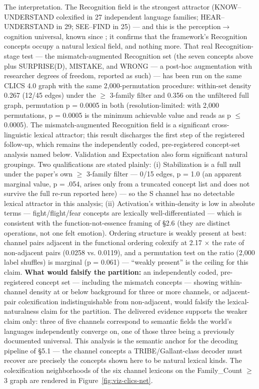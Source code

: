 \documentclass[11pt,twocolumn]{article}
\theoremstyle{plain}
\begin{document}
The interpretation. The Recognition field is the strongest attractor (KNOW–UNDERSTAND colexified in 27 independent language families; HEAR–UNDERSTAND in 29; SEE–FIND in 25) — and this is the perception$\to$cognition universal, known since \citet{viberg1984}; it confirms that the framework's Recognition concepts occupy a natural lexical field, and nothing more. That real Recognition-stage test — the mismatch-augmented Recognition set (the seven concepts above plus SURPRISE(D), MISTAKE, and WRONG — a post-hoc augmentation with researcher degrees of freedom, reported as such) — has been run on the same CLICS 4.0 graph with the same 2,000-permutation procedure: within-set density 0.267 (12/45 edges) under the $\geq$ 3-family filter and 0.356 on the unfiltered full graph, permutation p = 0.0005 in both (resolution-limited: with 2,000 permutations, p = 0.0005 is the minimum achievable value and reads as p $\leq$ 0.0005). The mismatch-augmented Recognition field is a significant cross-linguistic lexical attractor; this result discharges the first step of the registered follow-up, which remains the independently coded, pre-registered concept-set analysis named below. Validation and Expectation also form significant natural groupings. Two qualifications are stated plainly: (i) Stabilization is a full null under the paper's own $\geq$ 3-family filter — 0/15 edges, p = 1.0 (an apparent marginal value, p = .054, arises only from a truncated concept list and does not survive the full re-run reported here) — so the S channel has no detectable lexical attractor in this analysis; (ii) Activation's within-density is low in absolute terms — fight/flight/fear concepts are lexically well-differentiated — which is consistent with the function-not-essence framing of \S{}2.6 (they are distinct operations, not one felt emotion). Ordering structure is weakly present at best: channel pairs adjacent in the functional ordering colexify at 2.17 $\times$ the rate of non-adjacent pairs (0.0258 vs. 0.0119), and a permutation test on the ratio (2,000 label shuffles) is marginal (p = 0.061) — “weakly present” is the ceiling for this claim. \textbf{What would falsify the partition:} an independently coded, pre-registered concept set — including the mismatch concepts — showing within-channel density at or below background for three or more channels, or adjacent-pair colexification indistinguishable from non-adjacent, would falsify the lexical-naturalness claim for the partition. The delivered evidence supports the weaker claim only: three of five channels correspond to semantic fields the world's languages independently converge on, one of those three being a previously documented universal. This analysis is the semantic anchor for the decoding pipeline of \S{}5.1 — the channel concepts a TRIBE/Gallant-class decoder must recover are precisely the concepts shown here to be natural lexical kinds. The colexification neighborhoods of the six channel lexicons on the Family\_Count $\geq$ 3 graph are rendered in Figure~\ref{fig:viz-clics-net}.
\end{document}
